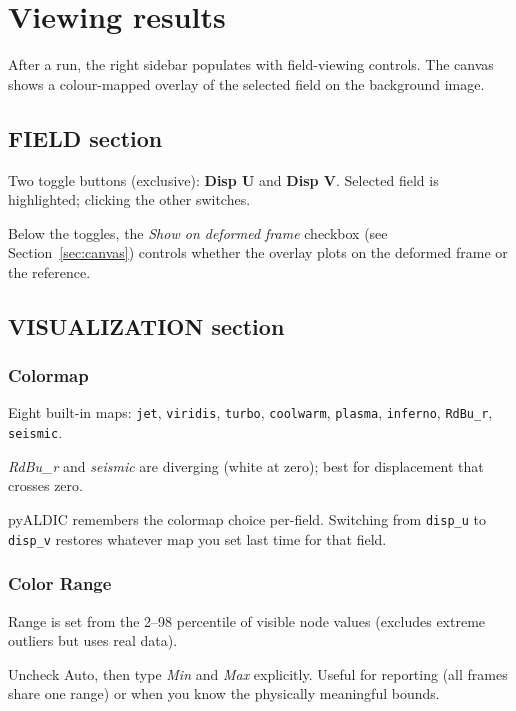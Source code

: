 \section{Viewing results}
\label{sec:viewing-results}

After a run, the right sidebar populates with field-viewing
controls. The canvas shows a colour-mapped overlay of the selected
field on the background image.

\subsection{FIELD section}

Two toggle buttons (exclusive): \textbf{Disp U} and \textbf{Disp V}.
Selected field is highlighted; clicking the other switches.

Below the toggles, the \emph{Show on deformed frame} checkbox (see
Section~\ref{sec:canvas}) controls whether the overlay plots on the
deformed frame or the reference.

\subsection{VISUALIZATION section}

\subsubsection*{Colormap}

Eight built-in maps: \texttt{jet}, \texttt{viridis}, \texttt{turbo},
\texttt{coolwarm}, \texttt{plasma}, \texttt{inferno},
\texttt{RdBu\_r}, \texttt{seismic}.

\emph{RdBu\_r} and \emph{seismic} are diverging (white at zero);
best for displacement that crosses zero.

pyALDIC remembers the colormap choice per-field. Switching from
\texttt{disp\_u} to \texttt{disp\_v} restores whatever map you set
last time for that field.

\subsubsection*{Color Range}

\begin{description}[leftmargin=1.2cm,style=nextline]
  \item[Auto (default)]
    Range is set from the 2--98 percentile of visible node values
    (excludes extreme outliers but uses real data).
  \item[Manual]
    Uncheck Auto, then type \emph{Min} and \emph{Max} explicitly.
    Useful for reporting (all frames share one range) or when you
    know the physically meaningful bounds.
\end{description}

